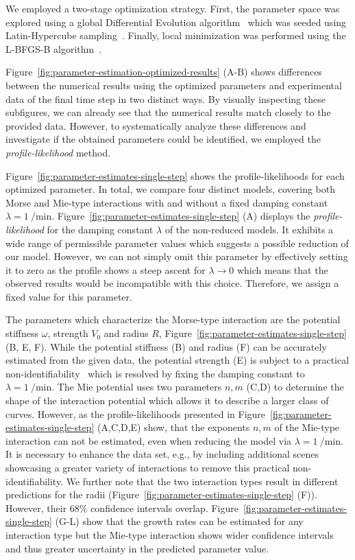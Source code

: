 We employed a two-stage optimization strategy.
First, the parameter space was explored using a global Differential Evolution
algorithm~\cite{Storn1997} which was seeded using Latin-Hypercube sampling~\cite{McKay1979}.
Finally, local minimization was performed using the L-BFGS-B algorithm~\cite{Liu1989}.

Figure~\ref{fig:parameter-estimation-optimized-results} (A-B) shows differences between the
numerical results using the optimized parameters and experimental data of the final time step in two
distinct ways.
By visually inspecting these subfigures, we can already see that the numerical results match closely
to the provided data.
However, to systematically analyze these differences and investigate if the obtained
parameters could be identified, we employed the \textit{profile-likelihood} method.

Figure~\ref{fig:parameter-estimates-single-step} shows the profile-likelihoods for each optimized
parameter.
In total, we compare four distinct models, covering both Morse and Mie-type interactions with and
without a fixed damping constant $\lambda=\SI{1}{\per\minute}$.
Figure~\ref{fig:parameter-estimates-single-step} (A) displays the \textit{profile-likelihood} for
the damping constant $\lambda$ of the non-reduced models.
It exhibits a wide range of permissible parameter values which suggests a possible reduction of our
model.
However, we can not simply omit this parameter by effectively setting it to zero as the profile
shows a steep ascent for $\lambda\rightarrow0$ which means that the observed results would be
incompatible with this choice.
Therefore, we assign a fixed value for this parameter.

The parameters which characterize the Morse-type interaction are the potential stiffness $\omega$,
strength $V_0$ and radius $R$, Figure~\ref{fig:parameter-estimates-single-step} (B, E, F).
While the potential stiffness (B) and radius (F) can be accurately estimated from the given data,
the potential strength (E) is subject to a practical non-identifiability~\cite{Raue2009} which is
resolved by fixing the damping constant to $\lambda=\SI{1}{\per\minute}$.
The Mie potential uses two parameters $n,m$ (C,D) to determine the shape of the interaction
potential which allows it to describe a larger class of curves.
However, as the profile-likelihoods presented in Figure~\ref{fig:parameter-estimates-single-step}
(A,C,D,E) show, that the exponents $n,m$ of the Mie-type interaction can not be estimated, even when
reducing the model via $\lambda=\SI{1}{\per\minute}$.
It is necessary to enhance the data set, e.g., by including additional scenes showcasing a greater
variety of interactions to remove this practical non-identifiability.
We further note that the two interaction types result in different predictions for the radii
(Figure~\ref{fig:parameter-estimates-single-step} (F)).
However, their $68\%$ confidence intervals overlap.
Figure~\ref{fig:parameter-estimates-single-step} (G-L) show that the growth rates can be estimated
for any interaction type but the Mie-type interaction shows wider confidence intervals and thus
greater uncertainty in the predicted parameter value.

